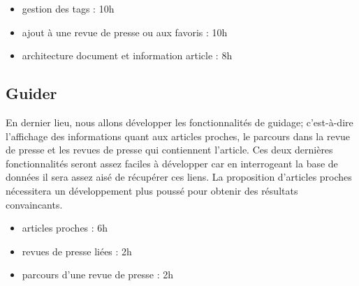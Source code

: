 		\begin{itemize}
			\item gestion des tags : 10h
			\item ajout à une revue de presse ou aux favoris : 10h
			\item architecture document et information article : 8h
		\end{itemize}

	\subsection{Guider}
	\label{subsec:guider}
		En dernier lieu, nous allons développer les fonctionnalités de guidage; c'est-à-dire l'affichage des informations quant aux articles proches, le parcours dans la revue de presse et les revues de presse qui contiennent l'article. Ces deux dernières fonctionnalités seront assez faciles à développer car en interrogeant la base de données il sera assez aisé de récupérer ces liens. La proposition d'articles proches nécessitera un développement plus poussé pour obtenir des résultats convaincants.

		\begin{itemize}
			\item articles proches : 6h
			\item revues de presse liées : 2h
			\item parcours d'une revue de presse : 2h
		\end{itemize}